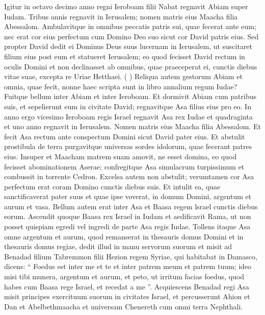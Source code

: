 \begin{biblechapter}
\begin{biblechapter}
\begin{biblechapter}
\begin{biblechapter}
\begin{biblechapter}
\begin{biblechapter}
\begin{biblechapter}
\begin{biblechapter}
\begin{biblechapter}
\begin{biblechapter}
\begin{biblechapter}
\begin{biblechapter}
\begin{biblechapter}
\begin{biblechapter}
\begin{biblechapter}
\verse Igitur in octavo decimo anno regni Ieroboam filii Nabat regnavit Abiam super Iudam. 
\verse Tribus annis regnavit in Ierusalem; nomen matris eius Maacha filia Abessalom. 
\verse Ambulavitque in omnibus peccatis patris sui, quae fecerat ante eum; nec erat cor eius perfectum cum Domino Deo suo sicut cor David patris eius. 
\verse Sed propter David dedit ei Dominus Deus suus lucernam in Ierusalem, ut suscitaret filium eius post eum et statueret Ierusalem; 
\verse eo quod fecisset David rectum in oculis Domini et non declinasset ab omnibus, quae praeceperat ei, cunctis diebus vitae suae, excepta re Uriae Hetthaei. ( \verse )
 \verse Reliqua autem gestorum Abiam et omnia, quae fecit, nonne haec scripta sunt in libro annalium regum Iudae? Fuitque bellum inter Abiam et inter Ieroboam. 
\verse Et dormivit Abiam cum patribus suis, et sepelierunt eum in civitate David; regnavitque Asa filius eius pro eo.
 \verse In anno ergo vicesimo Ieroboam regis Israel regnavit Asa rex Iudae 
\verse et quadraginta et uno anno regnavit in Ierusalem. Nomen matris eius Maacha filia Abessalom.
 \verse Et fecit Asa rectum ante conspectum Domini sicut David pater eius. 
\verse Et abstulit prostibula de terra purgavitque universas sordes idolorum, quae fecerant patres eius. 
\verse Insuper et Maacham matrem suam amovit, ne esset domina, eo quod fecisset abominationem Aserae; confregitque Asa simulacrum turpissimum et combussit in torrente Cedron. 
\verse Excelsa autem non abstulit; verumtamen cor Asa perfectum erat coram Domino cunctis diebus suis. 
\verse Et intulit ea, quae sanctificaverat pater suus et quae ipse voverat, in domum Domini, argentum et aurum et vasa.
 \verse Bellum autem erat inter Asa et Baasa regem lsrael cunctis diebus eorum. 
 \verse Ascendit quoque Baasa rex Israel in Iudam et aedificavit Rama, ut non posset quispiam egredi vel ingredi de parte Asa regis Iudae. 
\verse Tollens itaque Asa omne argentum et aurum, quod remanserat in thesauris domus Domini et in thesauris domus regiae, dedit illud in manu servorum suorum et misit ad Benadad filium Tabremmon filii Hezion regem Syriae, qui habitabat in Damasco, dicens: 
 \verse “ Foedus est inter me et te et inter patrem meum et patrem tuum; ideo misi tibi munera, argentum et aurum, et peto, ut irritum facias foedus, quod habes cum Baasa rege Israel, et recedat a me ”. 
\verse Acquiescens Benadad regi Asa misit principes exercituum suorum in civitates Israel, et percusserunt Ahion et Dan et Abelbethmaacha et universam Chenereth cum omni terra Nephthali. 

\end{biblechapter}
\end{biblechapter}
\end{biblechapter}
\end{biblechapter}
\end{biblechapter}
\end{biblechapter}
\end{biblechapter}
\end{biblechapter}
\end{biblechapter}
\end{biblechapter}
\end{biblechapter}
\end{biblechapter}
\end{biblechapter}
\end{biblechapter}
\end{biblechapter}
